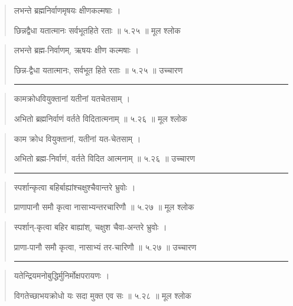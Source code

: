 \begin{quotation}  

लभन्ते ब्रह्मनिर्वाणमृषयः क्षीणकल्मषाः  ।  

छिन्नद्वैधा यतात्मानः सर्वभूतहिते रताः  ॥ ५.२५ ॥  मूल श्लोक
\end{quotation}

\begin{quotation}

लभन्ते ब्रह्म-निर्वाणम्, ऋषयः क्षीण कल्मषाः  ।  

छिन्न-द्वैधा यतात्मानः, सर्वभूत हिते रताः  ॥ ५.२५ ॥  उच्चारण

\noindent\rule{16cm}{0.4pt} 
\end{quotation}


\begin{quotation}  

कामक्रोधवियुक्तानां यतीनां यतचेतसाम्‌  ।  

अभितो ब्रह्मनिर्वाणं वर्तते विदितात्मनाम्‌  ॥ ५.२६ ॥  मूल श्लोक
\end{quotation}

\begin{quotation}

काम क्रोध वियुक्तानां, यतीनां यत-चेतसाम्‌  ।  

अभितो ब्रह्म-निर्वाणं, वर्तते विदित आत्मनाम्‌  ॥ ५.२६ ॥  उच्चारण

\noindent\rule{16cm}{0.4pt} 
\end{quotation}


\begin{quotation}  

स्पर्शान्कृत्वा बहिर्बाह्यांश्चक्षुश्चैवान्तरे भ्रुवोः  ।  

प्राणापानौ समौ कृत्वा नासाभ्यन्तरचारिणौ  ॥ ५.२७ ॥  मूल श्लोक
\end{quotation}

\begin{quotation}

स्पर्शान्-कृत्वा बहिर बाह्यांश्, चक्षुश चैवा-अन्तरे भ्रुवोः  ।  

प्राणा-पानौ समौ कृत्वा, नासाभ्यं तर-चारिणौ  ॥ ५.२७ ॥  उच्चारण

\noindent\rule{16cm}{0.4pt} 
\end{quotation}


\begin{quotation}  

यतेन्द्रियमनोबुद्धिर्मुनिर्मोक्षपरायणः  ।  

विगतेच्छाभयक्रोधो यः सदा मुक्त एव सः  ॥ ५.२८ ॥  मूल श्लोक
\end{quotation}

